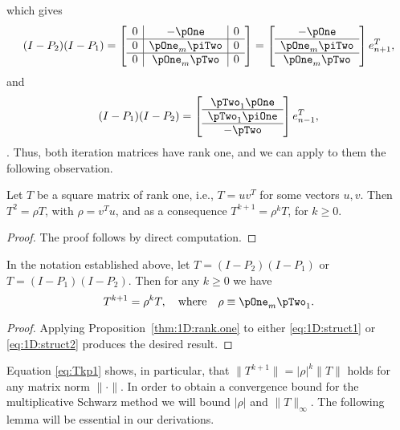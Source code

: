 %
which gives
%
\begin{equation}\label{eq:1D:struct1}
(I-P_2)(I-P_1) = \left[\begin{array}{c|c|c}0&-\pOne&0\\\hline 0&\pOne_m\piTwo&0\\\hline 0&\pOne_m \pTwo&0\end{array}\right]=
\left[\begin{array}{c}-\pOne\\\hline \pOne_m\piTwo\\\hline \pOne_m \pTwo\end{array}\right]
e_{n+1}^T,
\end{equation}
%
and
%
\begin{equation}\label{eq:1D:struct2}
(I-P_1)(I-P_2)=
\left[\begin{array}{c}
 \pTwo_1 \pOne\\
\hline
 \pTwo_1\piOne\\
 \hline
  -\pTwo\end{array}\right]
e_{n-1}^T,
\end{equation}
.
%
Thus, both iteration matrices have rank one, and we
can apply to them the following observation.

\begin{prop} \label{thm:1D:rank.one}
Let $T$ be a square matrix of rank one, i.e., $T=uv^T$ for some
vectors $u, v$. Then $T^2 = \rho T$, with $\rho = v^Tu$, and as
a consequence $T^{k+1} = \rho^{k} T$, for $k\geq 0$.
\end{prop}

\begin{proof}
The proof follows by direct computation.
\end{proof}

\begin{cor}
In the notation established above, let $T=(I-P_2)(I-P_1)$ or
$T=(I-P_1)(I-P_2)$. Then for any $k\geq 0$ we have
%
\begin{equation}\label{eq:Tkp1}
T^{k+1} =  \rho^{k} T,\quad\mbox{where}\quad \rho \equiv \pOne_m \pTwo_1.
\end{equation}
%
\end{cor}

\begin{proof}
Applying Proposition~\ref{thm:1D:rank.one} to either
\eqref{eq:1D:struct1} or \eqref{eq:1D:struct2} produces the desired result.
%
\end{proof}

Equation \eqref{eq:Tkp1} shows, in particular, that
$\|T^{k+1}\|=|\rho|^k \|T\|$ holds for any matrix norm $\|\cdot\|$.
In order to obtain a convergence bound for the multiplicative Schwarz method
we will bound $|\rho|$ and $\|T\|_\infty$. The following lemma will be
essential in our derivations.

